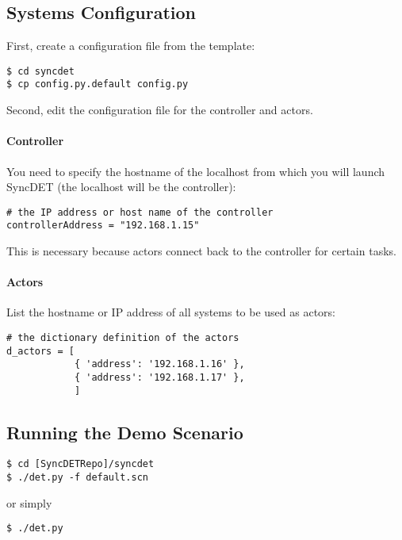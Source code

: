 \subsection{Systems Configuration}
First, create a configuration file from the template:
\begin{verbatim}
$ cd syncdet
$ cp config.py.default config.py
\end{verbatim}

Second, edit the configuration file for the controller and actors. 

\paragraph{Controller} 
You need to specify the hostname of the localhost from which you will launch
SyncDET (the localhost will be the controller):
\begin{verbatim}
# the IP address or host name of the controller
controllerAddress = "192.168.1.15"
\end{verbatim}
This is necessary because actors connect back to the controller for certain tasks.

\paragraph{Actors} 
List the hostname or IP address of all systems to be used as actors:
\begin{verbatim}
# the dictionary definition of the actors
d_actors = [
            { 'address': '192.168.1.16' },
            { 'address': '192.168.1.17' },
            ]
\end{verbatim}

\subsection{Running the Demo Scenario}
\begin{verbatim}
$ cd [SyncDETRepo]/syncdet
$ ./det.py -f default.scn
\end{verbatim}

or simply

\begin{verbatim}
$ ./det.py
\end{verbatim}
